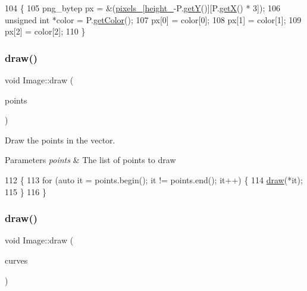 \begin{DoxyCode}
104                         \{
105     png\_bytep px = \&(\mbox{\hyperlink{class_image_a51351c8507499d09cb9667c20ef01faf}{pixels\_}}[\mbox{\hyperlink{class_image_a64a699c5bb8e8a18c6971a8032806dba}{height\_}}-P.\mbox{\hyperlink{class_point_a86d10ff46e08462c45b15a8c7ef62d61}{getY}}()][P.\mbox{\hyperlink{class_point_ac9d5859db121c7d1b89ca89266dca0a3}{getX}}() * 3]);
106     \textcolor{keywordtype}{unsigned} \textcolor{keywordtype}{int} *color = P.\mbox{\hyperlink{class_point_a1aa902dd929328baec8c8f6970284ac2}{getColor}}();
107     px[0] = color[0];
108     px[1] = color[1];
109     px[2] = color[2];
110 \}
\end{DoxyCode}
\mbox{\label{class_image_aecc7a0365eb204dba714a71bcb86361d}} 
\subsubsection{\texorpdfstring{draw()}{draw()}\hspace{0.1cm}{\footnotesize\ttfamily [2/3]}}
{\footnotesize\ttfamily void Image\+::draw (\begin{DoxyParamCaption}\item[{std\+::vector$<$ \mbox{\hyperlink{class_point}{Point}} $>$}]{points }\end{DoxyParamCaption})}



Draw the points in the vector. 


\begin{DoxyParams}{Parameters}
{\em points} & The list of points to draw \\
\hline
\end{DoxyParams}

\begin{DoxyCode}
112                                         \{
113     \textcolor{keywordflow}{for} (\textcolor{keyword}{auto} it = points.begin(); it != points.end(); it++) \{
114         \mbox{\hyperlink{class_image_a8d162f3cab956131d58708c09aa560b0}{draw}}(*it);
115     \}
116 \}
\end{DoxyCode}
\mbox{\label{class_image_a6349aee8ec05bbecb9b6e6430de07d7c}} 
\subsubsection{\texorpdfstring{draw()}{draw()}\hspace{0.1cm}{\footnotesize\ttfamily [3/3]}}
{\footnotesize\ttfamily void Image\+::draw (\begin{DoxyParamCaption}\item[{std\+::vector$<$ \mbox{\hyperlink{class_bezier_curve}{Bezier\+Curve}} $>$}]{curves }\end{DoxyParamCaption})}




